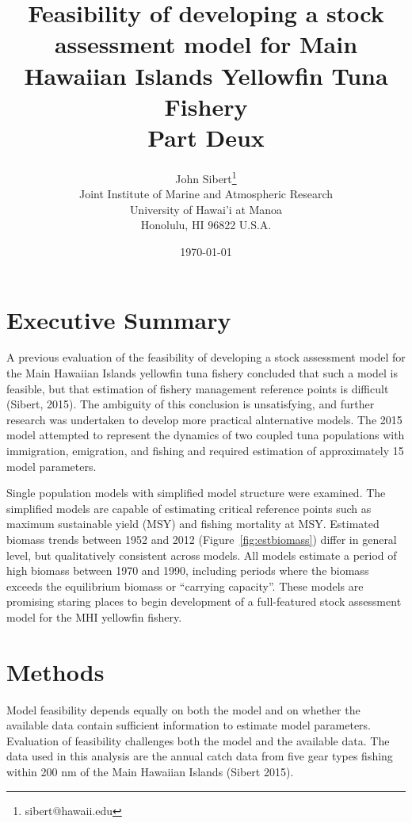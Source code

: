 \documentclass[12pt,letterpaper,twoside]{article}
\title{Feasibility of developing a stock assessment model for Main
Hawaiian Islands Yellowfin Tuna Fishery\\
\vspace{2ex}
Part Deux}
\author{
John Sibert\thanks{sibert@hawaii.edu}\\
Joint Institute of Marine and Atmospheric Research\\
University of Hawai'i at Manoa\\
Honolulu, HI  96822 U.S.A.\\[0.125in]
\date{\today}
}
\newcommand\doublespacing{\baselineskip=1.6\normalbaselineskip}
\begin{document}
\maketitle



\section{Executive Summary}
A previous evaluation of the feasibility of developing a
stock assessment model for the Main Hawaiian Islands yellowfin tuna
fishery concluded that such a model is feasible, but that estimation of
fishery management reference points is difficult (Sibert, 2015).
The ambiguity of this
conclusion is unsatisfying, and further research was undertaken to
develop more practical alnternative models. 
The 2015 model attempted to represent
the dynamics of two coupled tuna populations with immigration,
emigration, and fishing and required estimation of approximately 15
model parameters.

Single population models with simplified model
structure
were examined. The simplified models are capable of
estimating critical reference points such as maximum sustainable
yield (MSY) and fishing mortality at MSY. 
Estimated biomass trends between 1952 and 2012 
(Figure~\ref{fig:estbiomass}) differ in general level, but
qualitatively consistent across models. All models estimate a period of high
biomass between 1970 and 1990, 
including periods where the biomass exceeds the
equilibrium biomass or ``carrying capacity''. 
These models are
promising staring places to begin development of a full-featured stock
assessment model for the MHI yellowfin fishery.

\section{Methods}
Model feasibility depends equally on both the model and on whether the
available data
contain sufficient information to estimate model parameters.
Evaluation of feasibility challenges both the model and the available
data. The data used in this analysis are the annual catch data from
five gear types fishing within 200 nm of the Main Hawaiian Islands
(Sibert 2015).
\end{document}
